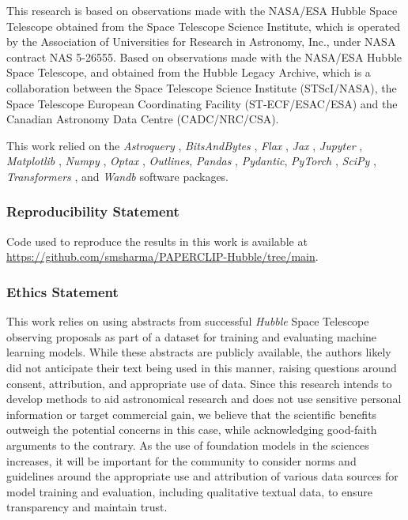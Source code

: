\documentclass{article} %
\newcommand{\package}[1]{\textsl{#1}\xspace}
\newcommand{\hubble}{\emph{Hubble}\xspace}
\begin{document}
This research is based on observations made with the NASA/ESA Hubble Space Telescope obtained from the Space Telescope Science Institute, which is operated by the Association of Universities for Research in Astronomy, Inc., under NASA contract NAS 5-26555.
%
Based on observations made with the NASA/ESA Hubble Space Telescope, and obtained from the Hubble Legacy Archive, which is a collaboration between the Space Telescope Science Institute (STScI/NASA), the Space Telescope European Coordinating Facility (ST-ECF/ESAC/ESA) and the Canadian Astronomy Data Centre (CADC/NRC/CSA).

This work relied on the \package{Astroquery} \citep{2019AJ....157...98G}, \package{BitsAndBytes} \citep{dettmers2022llmint8}, \package{Flax} \citep{flax2020github}, \package{Jax} \citep{jax2018github}, \package{Jupyter} \citep{Kluyver2016jupyter}, \package{Matplotlib} \citep{Hunter:2007}, \package{Numpy} \citep{harris2020array}, \package{Optax} \citep{deepmind2020jax}, \package{Outlines}, \package{Pandas} \citep{2020SciPy-NMeth}, \package{Pydantic}, \package{PyTorch} \citep{paszke2019pytorch}, \package{SciPy} \citep{2020SciPy-NMeth}, \package{Transformers} \citep{wolf2019huggingface}, and \package{Wandb} \citep{wandb} software packages.

 \subsubsection*{Reproducibility Statement}

 Code used to reproduce the results in this work is available at \url{https://github.com/smsharma/PAPERCLIP-Hubble/tree/main}.

\subsubsection*{Ethics Statement}
This work relies on using abstracts from successful \hubble Space Telescope observing proposals as part of a dataset for training and evaluating machine learning models. While these abstracts are publicly available, the authors likely did not anticipate their text being used in this manner, raising questions around consent, attribution, and appropriate use of data. Since this research intends to develop methods to aid astronomical research and does not use sensitive personal information or target commercial gain, we believe that the scientific benefits outweigh the potential concerns in this case, while acknowledging good-faith arguments to the contrary. As the use of foundation models in the sciences increases, it will be important for the community to consider norms and guidelines around the appropriate use and attribution of various data sources for model training and evaluation, including qualitative textual data, to ensure transparency and maintain trust.
\end{document}
